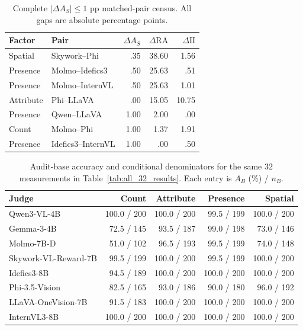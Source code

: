 \begin{table}[t]
\centering
\scriptsize
\caption{Complete $|\Delta A_S|\leq1$ pp matched-pair census. All gaps are
absolute percentage points.}
\label{tab:matched_pairs_1pp}
\begin{tabular}{llrrr}
\toprule
Factor & Pair & $\Delta A_S$ & $\Delta\mathrm{RA}$ & $\Delta\mathrm{II}$\\
\midrule
Spatial & Skywork--Phi & .35 & 38.60 & 1.56\\
Presence & Molmo--Idefics3 & .50 & 25.63 & .51\\
Presence & Molmo--InternVL & .50 & 25.63 & 1.01\\
Attribute & Phi--LLaVA & .00 & 15.05 & 10.75\\
Presence & Qwen--LLaVA & 1.00 & 2.00 & .00\\
Count & Molmo--Phi & 1.00 & 1.37 & 1.91\\
Presence & Idefics3--InternVL & 1.00 & .00 & .50\\
\bottomrule
\end{tabular}
\end{table}

\begin{table}[t]
\centering
\scriptsize
\caption{Audit-base accuracy and conditional denominators for the same 32
measurements in Table~\ref{tab:all_32_results}. Each entry is $A_B$ (\%) / $n_B$.}
\label{tab:all_32_base_accuracy}
\setlength{\tabcolsep}{7pt}
\begin{tabular}{lrrrr}
\toprule
Judge & Count & Attribute & Presence & Spatial \\
\midrule
Qwen3-VL-4B & 100.0 / 200 & 100.0 / 200 & 99.5 / 199 & 100.0 / 200 \\
Gemma-3-4B & 72.5 / 145 & 93.5 / 187 & 99.0 / 198 & 73.0 / 146 \\
Molmo-7B-D & 51.0 / 102 & 96.5 / 193 & 99.5 / 199 & 74.0 / 148 \\
Skywork-VL-Reward-7B & 99.5 / 199 & 100.0 / 200 & 99.5 / 199 & 100.0 / 200 \\
Idefics3-8B & 94.5 / 189 & 100.0 / 200 & 100.0 / 200 & 100.0 / 200 \\
Phi-3.5-Vision & 82.5 / 165 & 93.0 / 186 & 90.0 / 180 & 96.0 / 192 \\
LLaVA-OneVision-7B & 91.5 / 183 & 100.0 / 200 & 100.0 / 200 & 100.0 / 200 \\
InternVL3-8B & 100.0 / 200 & 100.0 / 200 & 100.0 / 200 & 100.0 / 200 \\
\bottomrule
\end{tabular}
\end{table}

